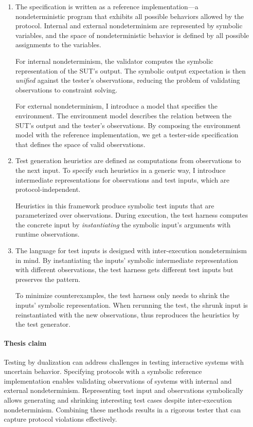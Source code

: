 \begin{enumerate}
\item The specification is written as a reference implementation---a
  nondeterministic program that exhibits all possible behaviors allowed by the
  protocol.  Internal and external nondeterminism are represented by symbolic
  variables, and the space of nondeterministic behavior is defined by all
  possible assignments to the variables.

  For internal nondeterminism, the validator computes the symbolic
  representation of the SUT's output.  The symbolic output expectation is then
  {\em unified} against the tester's observations, reducing the problem of
  validating observations to constraint solving.

  For external nondeterminism, I introduce a model that specifies the
  environment.  The environment model describes the relation between the SUT's
  output and the tester's observations.  By composing the environment model with
  the reference implementation, we get a tester-side specification that defines
  the space of valid observations.
\item Test generation heuristics are defined as computations from observations
  to the next input.  To specify such heuristics in a generic way, I introduce
  intermediate representations for observations and test inputs, which are
  protocol-independent.

  Heuristics in this framework produce symbolic test inputs that are
  parameterized over observations.  During execution, the test harness computes
  the concrete input by {\em instantiating} the symbolic input's arguments with
  runtime observations.
\item The language for test inputs is designed with inter-execution
  nondeterminism in mind.  By instantiating the inputs' symbolic intermediate
  representation with different observations, the test harness gets different
  test inputs but preserves the pattern.

  To minimize counterexamples, the test harness only needs to shrink the inputs'
  symbolic representation.  When rerunning the test, the shrunk input is
  reinstantiated with the new observations, thus reproduces the heuristics by
  the test generator.
\end{enumerate}

\paragraph{Thesis claim}
Testing by dualization can address challenges in testing interactive systems
with uncertain behavior.  Specifying protocols with a symbolic reference
implementation enables validating observations of systems with internal and
external nondeterminism.  Representing test input and observations symbolically
allows generating and shrinking interesting test cases despite inter-execution
nondeterminism.  Combining these methods results in a rigorous tester that can
capture protocol violations effectively.

